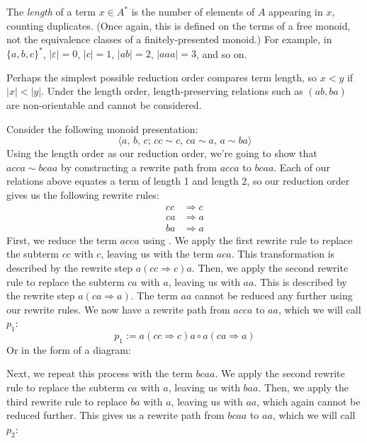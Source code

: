 \documentclass[../generics]{subfiles}
\begin{document}
\begin{definition}
The \emph{length} of a term $x\in A^*$ is the number of elements of $A$ appearing in $x$, counting duplicates. (Once again, this is defined on the terms of a free monoid, not the equivalence classes of a finitely-presented monoid.) For example, in $\{a,b,c\}^*$, $|\varepsilon|=0$, $|c|=1$, $|ab|=2$, $|aaa|=3$, and so on.
\end{definition}
Perhaps the simplest possible reduction order compares term length, so $x<y$ if $|x|<|y|$. Under the length order, length-preserving relations such as $(ab, ba)$ are non-orientable and cannot be considered.
\begin{example} Consider the following monoid presentation:
\[\langle a,\,b,\,c;\,cc\sim c,\,ca\sim a,\,a\sim ba\rangle\]
Using the length order as our reduction order, we're going to show that $acca\sim bcaa$ by constructing a rewrite path from $acca$ to $bcaa$. Each of our relations above equates a term of length 1 and length 2, so our reduction order gives us the following rewrite rules:
\begin{align*}
cc&\Rightarrow c\\
ca&\Rightarrow a\\
ba&\Rightarrow a
\end{align*}
First, we reduce the term $acca$ using . We apply the first rewrite rule to replace the subterm $cc$ with $c$, leaving us with the term $aca$. This transformation is described by the rewrite step $a(cc\Rightarrow c)a$. Then, we apply the second rewrite rule to replace the subterm $ca$ with $a$, leaving us with $aa$. This is described by the rewrite step $a(ca\Rightarrow a)$. The term $aa$ cannot be reduced any further using our rewrite rules. We now have a rewrite path from $acca$ to $aa$, which we will call $p_1$:
\[p_1 := a(cc\Rightarrow c)a\circ a(ca\Rightarrow a)\]
Or in the form of a diagram:
\begin{quote}
\end{quote}
Next, we repeat this process with the term $bcaa$. We apply the second rewrite rule to replace the subterm $ca$ with $a$, leaving us with $baa$. Then, we apply the third rewrite rule to replace $ba$ with $a$, leaving us with $aa$, which again cannot be reduced further. This gives us a rewrite path from $bcaa$ to $aa$, which we will call $p_2$:

\end{example}
\end{document}
